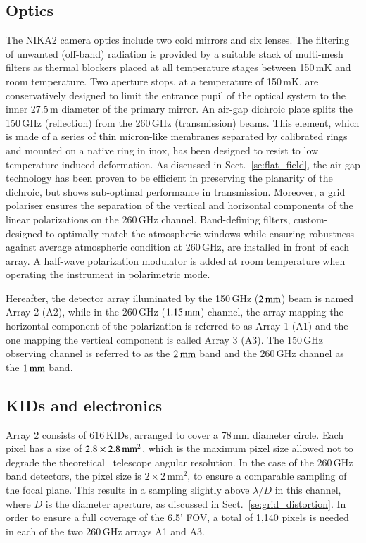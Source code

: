 \subsection{Optics}
\label{se:instru_optics}
The NIKA2 camera optics include two cold mirrors and six lenses. The
filtering of unwanted (off-band) radiation is provided by a suitable stack of
multi-mesh filters {\lp as thermal blockers} placed at all temperature
stages between 150\,mK and room temperature. {\lp Two aperture stops,
at a temperature of 150\,mK, are conservatively designed to limit the
entrance pupil of the optical system to the inner 27.5\,m diameter of
the primary mirror. }
An air-gap dichroic plate splits the 150\,GHz (reflection)
from the 260\,GHz (transmission) beams. {\lp This element, which is
made of a series of thin micron-like membranes separated by calibrated
rings and mounted on a native ring in inox, has been designed to
resist to low temperature-induced deformation.}
As discussed in Sect.~\ref{se:flat_field}, the air-gap technology has
been proven to be efficient
in preserving the planarity of the dichroic, but shows sub-optimal
performance in transmission. Moreover, a grid polariser ensures the
separation of the vertical and horizontal components of the linear
polarizations on the 260\,GHz channel. Band-defining filters,
custom-designed to optimally match the atmospheric windows while
ensuring robustness against average atmospheric condition at 260\,GHz,
are installed in front of each array. A half-wave polarization
modulator is added at room temperature when operating the instrument
in polarimetric mode.

Hereafter, the detector array illuminated by the 150\,GHz
($2\, \rm{mm}$) beam is named Array 2 (A2), %
while in the 260\,GHz ($1.15\, \rm{mm}$) channel, the array mapping the
horizontal component of the polarization is referred to as Array 1 (A1)
and the one mapping the vertical component is called Array 3 (A3). The
150\,GHz observing channel is referred to as the $2\, \rm{mm}$ band
and the 260\,GHz channel as the $1\, \rm{mm}$ band. 

\subsection{KIDs and electronics}
\label{se:array}

Array 2 consists of 616\,KIDs, arranged to cover a 78\,mm diameter
circle. Each pixel has a size of $2.8\times2.8\textrm{\,mm}^2$, which
is the maximum pixel size allowed not to degrade the theoretical
\trentemetre\ telescope angular resolution. In the
case of the 260\,GHz band detectors, the pixel size is $2\times
2\mathrm{\,mm}^2$, to ensure a comparable sampling of the focal
plane. {\rev This results in a sampling slightly above $\lambda/D$ in
this channel, where $D$ is the diameter aperture, as discussed in
Sect.~\ref{se:grid_distortion}.}
In order to ensure a full coverage of the 6.5' FOV, a total of
1,140 pixels is needed in each of the two 260\,GHz arrays A1 and A3. 


